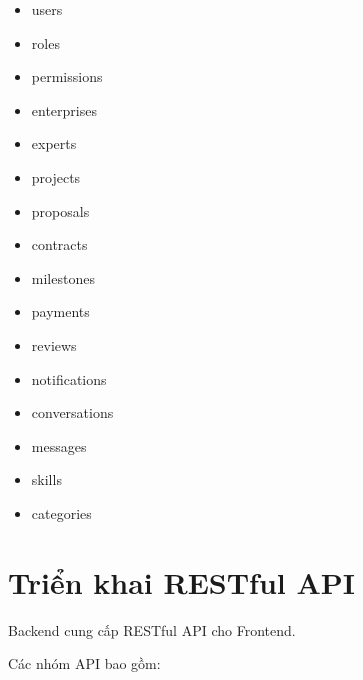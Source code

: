 \begin{itemize}

\item users

\item roles

\item permissions

\item enterprises

\item experts

\item projects

\item proposals

\item contracts

\item milestones

\item payments

\item reviews

\item notifications

\item conversations

\item messages

\item skills

\item categories

\end{itemize}


\section{Triển khai RESTful API}

Backend cung cấp RESTful API cho Frontend.

Các nhóm API bao gồm:

